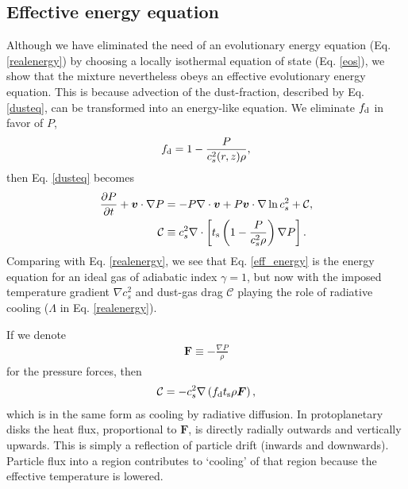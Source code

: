 \subsection{Effective energy equation}
Although we have eliminated the need of an evolutionary energy
equation (Eq. \ref{realenergy}) by choosing a locally isothermal
equation of state (Eq. \ref{eos}), we show that the mixture 
nevertheless obeys an effective evolutionary energy equation. This is
because advection of the dust-fraction, described by
Eq. \ref{dusteq}, can be transformed into an energy-like 
equation. We 
eliminate $f_\mathrm{d}$ in favor of $P$, 
\begin{align*}
  f_\mathrm{d} = 1 - \frac{P}{c_s^2(r,z)\rho}, 
\end{align*}
then Eq. \ref{dusteq} becomes
\begin{align}
\frac{\partial P}{\partial t} + \bm{v}\cdot\nabla P  
&= - P \nabla\cdot\bm{v} + P\bm{v}\cdot\nabla\ln{c_s^2}
                + \mathcal{C},  \label{eff_energy} \\
\mathcal{C}&\equiv c_s^2 \nabla\cdot\left[t_\mathrm{s}\left(1 -
  \frac{P}{c_s^2\rho}\right)\nabla 
  P\right].
\end{align}
Comparing with Eq. \ref{realenergy}, we see that 
Eq. \ref{eff_energy} is the energy equation for an ideal gas of
adiabatic index $\gamma=1$, but now with the imposed temperature
gradient $\nabla c_s^2$ and dust-gas drag $\mathcal{C}$ playing the
role of radiative cooling ($\Lambda$ in 
Eq. \ref{realenergy}). 

If we denote 
\begin{align}
  \bm{F} \equiv  - \frac{\nabla P}{\rho}
\end{align}
for the pressure forces, then
\begin{align*}
  \mathcal{C} = - c_s^2\nabla \left( f_\mathrm{d} t_\mathrm{s} \rho \bm{F}
  \right), 
\end{align*}
which is in the same form as cooling by radiative diffusion. In protoplanetary
disks the heat flux, proportional to $\bm{F}$, is directly radially
outwards and vertically upwards. This is simply a reflection of
particle drift (inwards and downwards). Particle flux into a region contributes
to `cooling' of that region because the effective temperature is
lowered. 

